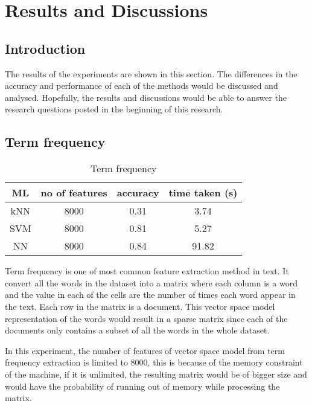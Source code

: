 
\chapter{Results and Discussions}

\section{Introduction}
The results of the experiments are shown in this section. The differences in the accuracy and performance of each of the methods would be discussed and analysed. Hopefully, the results and discussions would be able to answer the research questions posted in the beginning of this research.

\section{Term frequency}

\begin{table}[ht]
	\centering
	\begin{tabular}{|| c | c | c | c||}
		\hline
		ML & no of features & accuracy & time taken (s) \\ [0.5ex]
		\hline\hline
		kNN & 8000 & 0.31 & 3.74 \\ 
		\hline
		SVM & 8000 & 0.81 & 5.27 \\
		\hline
		NN & 8000 & 0.84 & 91.82 \\
		\hline
	\end{tabular}
\caption{Term frequency}
\label{tbl:termFrequency}
\end{table}

Term frequency is one of most common feature extraction method in text. It convert all the words in the dataset into a matrix where each column is a word and the value in each of the cells are the number of times each word appear in the text. Each row in the matrix is a document. This vector space model representation of the words would result in a sparse matrix since each of the documents only contains a subset of all the words in the whole dataset. 

In this experiment, the number of features of vector space model from term frequency extraction is limited to 8000, this is because of the memory constraint of the machine, if it is unlimited, the resulting matrix would be of bigger size and would have the probability of running out of memory while processing the matrix. 

